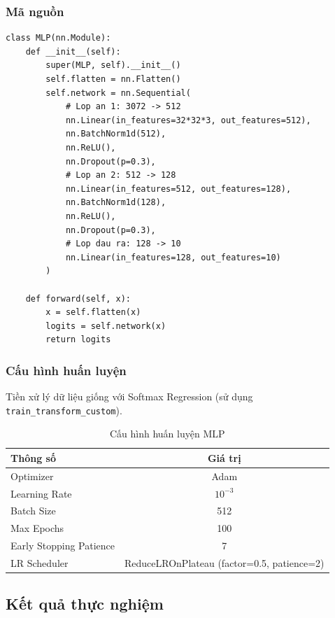 \documentclass[a4paper]{article}
\newcommand{\code}[1]{\texttt{\textcolor{blue!80!black}{#1}}}
\theoremstyle{definition}
\begin{document}
\subsubsection{Mã nguồn}
\begin{verbatim}
class MLP(nn.Module):
    def __init__(self):
        super(MLP, self).__init__()
        self.flatten = nn.Flatten()
        self.network = nn.Sequential(
            # Lop an 1: 3072 -> 512
            nn.Linear(in_features=32*32*3, out_features=512),
            nn.BatchNorm1d(512),
            nn.ReLU(),
            nn.Dropout(p=0.3),
            # Lop an 2: 512 -> 128
            nn.Linear(in_features=512, out_features=128),
            nn.BatchNorm1d(128),
            nn.ReLU(),
            nn.Dropout(p=0.3),
            # Lop dau ra: 128 -> 10
            nn.Linear(in_features=128, out_features=10)
        )

    def forward(self, x):
        x = self.flatten(x)
        logits = self.network(x)
        return logits
\end{verbatim}

\subsubsection{Cấu hình huấn luyện}
Tiền xử lý dữ liệu giống với Softmax Regression (sử dụng \code{train\_transform\_custom}).

\begin{table}[H]
	\centering
	\caption{Cấu hình huấn luyện MLP}
	\begin{tabular}{|l|c|}
		\hline
		\textbf{Thông số}          & \textbf{Giá trị} \\ \hline
		Optimizer                  & Adam \\ \hline
		Learning Rate              & $10^{-3}$ \\ \hline
		Batch Size                 & 512 \\ \hline
		Max Epochs                 & 100 \\ \hline
		Early Stopping Patience    & 7 \\ \hline
		LR Scheduler               & ReduceLROnPlateau (factor=0.5, patience=2) \\ \hline
	\end{tabular}
	\label{tab:mlp-config}
\end{table}

\subsection{Kết quả thực nghiệm}
\end{document}
